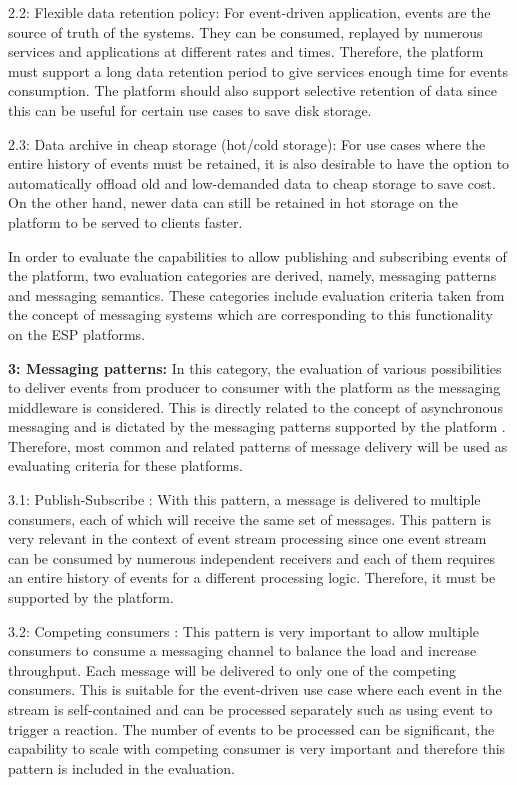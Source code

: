 2.2: Flexible data retention policy: For event-driven application, events are the source of truth of the systems. They can be consumed, replayed by numerous services and applications at different rates and times. Therefore, the platform must support a long data retention period to give services enough time for events consumption. The platform should also support selective retention of data since this can be useful for certain use cases to save disk storage.

2.3: Data archive in cheap storage (hot/cold storage): For use cases where the entire history of events must be retained, it is also desirable to have the option to automatically offload old and low-demanded data to cheap storage to save cost. On the other hand, newer data can still be retained in hot storage on the platform to be served to clients faster.

In order to evaluate the capabilities to allow publishing and subscribing events of the platform, two evaluation categories are derived, namely, messaging patterns and messaging semantics. These categories include evaluation criteria taken from the concept of messaging systems which are corresponding to this functionality on the ESP platforms.

\textbf{3: Messaging patterns:} In this category, the evaluation of various possibilities to deliver events from producer to consumer with the platform as the messaging middleware is considered. This is directly related to the concept of asynchronous messaging and is dictated by the messaging patterns supported by the platform \cite{messaging}. Therefore, most common and related patterns of message delivery will be used as evaluating criteria for these platforms.

3.1: Publish-Subscribe \cite{messagingpubsub}: 
With this pattern, a message is delivered to multiple consumers, each of which will receive the same set of messages. This pattern is very relevant in the context of event stream processing since one event stream can be consumed by numerous independent receivers and each of them requires an entire history of events for a different processing logic. Therefore, it must be supported by the platform.

3.2: Competing consumers \cite{messagingcompetingconsumers}:
This pattern is very important to allow multiple consumers to consume a messaging channel to balance the load and increase throughput. Each message will be delivered to only one of the competing consumers. This is suitable for the event-driven use case where each event in the stream is self-contained and can be processed separately such as using event to trigger a reaction. The number of events to be processed can be significant, the capability to scale with competing consumer is very important and therefore this pattern is included in the evaluation.

